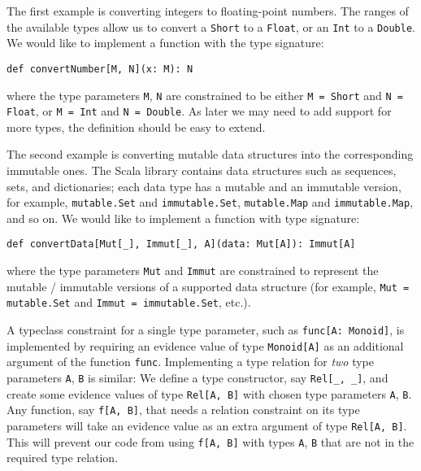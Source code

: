 The first example is converting integers to floating-point numbers.
The ranges of the available types allow us to convert a \lstinline!Short!
to a \lstinline!Float!, or an \lstinline!Int! to a \lstinline!Double!.
We would like to implement a function with the type signature:
\begin{lstlisting}
def convertNumber[M, N](x: M): N
\end{lstlisting}
where the type parameters \lstinline!M!, \lstinline!N! are constrained
to be either \lstinline!M = Short! and \lstinline!N = Float!, or
\lstinline!M = Int! and \lstinline!N = Double!. As later we may
need to add support for more types, the definition should be easy
to extend.

The second example is converting mutable data structures into the
corresponding immutable ones. The Scala library contains data structures
such as sequences, sets, and dictionaries; each data type has a mutable
and an immutable version, for example, \lstinline!mutable.Set! and
\lstinline!immutable.Set!, \lstinline!mutable.Map! and \lstinline!immutable.Map!,
and so on. We would like to implement a function with type signature:
\begin{lstlisting}
def convertData[Mut[_], Immut[_], A](data: Mut[A]): Immut[A]
\end{lstlisting}
where the type parameters \lstinline!Mut! and \lstinline!Immut!
are constrained to represent the mutable / immutable versions of a
supported data structure (for example, \lstinline!Mut = mutable.Set!
and \lstinline!Immut = immutable.Set!, etc.).

A typeclass constraint for a single type parameter, such as \lstinline!func[A: Monoid]!,
is implemented by requiring an evidence value
of type \lstinline!Monoid[A]! as an additional argument of the function
\lstinline!func!. Implementing a type relation for \emph{two} type
parameters \lstinline!A!, \lstinline!B! is similar: We define a
type constructor, say \lstinline!Rel[_, _]!, and create some evidence
values of type \lstinline!Rel[A, B]! with chosen type parameters
\lstinline!A!, \lstinline!B!. Any function, say \lstinline!f[A, B]!,
that needs a relation constraint on its type parameters will take
an evidence value as an extra argument of type \lstinline!Rel[A, B]!.
This will prevent our code from using \lstinline!f[A, B]! with types
\lstinline!A!, \lstinline!B! that are not in the required type relation. 

